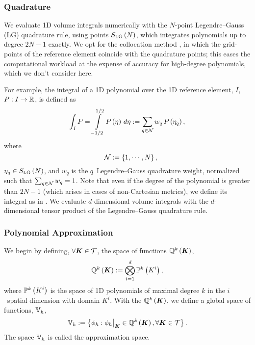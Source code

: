 \subsubsection{Quadrature}

We evaluate 1D volume integrals numerically with the $N$-point
Legendre--Gauss (LG) quadrature rule, using points $S_{\textsc{LG}}\left(N\right)$,
which integrates polynomials up to degree $2N-1$ exactly.
We opt for the collocation method \citep{bfg2013},
in which the grid-points of the
reference element coincide with the quadrature points;
this eases the computational workload at the expense of accuracy for
high-degree polynomials, which we don't consider here.

For example, the integral of a 1D polynomial over the 1D reference element, $I$,
$P:I\to\mathbb{R}$, is defined as
\begin{equation}
  \int_{I}P=\int\limits_{-1/2}^{1/2}P\left(\eta\right)\,d\eta
  :=\sum\limits_{q\in\mathcal{N}}w_{q}\,
  P\left(\eta_{q}\right),
  \label{eq.quad}
\end{equation}
where
\begin{equation}
  \hspace{1em}\mathcal{N}:=\left\{1,\cdots,N\right\},
\end{equation}
$\eta_{q}\in S_{\textsc{LG}}\left(N\right)$, and
$w_{q}$ is the $q$\myth\ Legendre--Gauss quadrature weight,
normalized such that $\sum_{q\in\mathcal{N}}w_{q}=1$.
Note that even if the degree of the polynomial is greater than
$2N-1$ (which arises in cases of non-Cartesian metrics),
we define its integral as in .
We evaluate $d$-dimensional volume integrals with the $d$-dimensional
tensor product of the Legendre--Gauss quadrature rule.

\subsubsection{Polynomial Approximation}

We begin by defining, $\forall\boldsymbol{K}\in\mathcal{T}$, the space of functions
$\mathbb{Q}^{k}\left(\boldsymbol{K}\right)$,
\begin{equation}
  \mathbb{Q}^{k}\left(\boldsymbol{K}\right)
  :=\bigotimes\limits_{i=1}^{d}\mathbb{P}^{k}\left(K^{i}\right),
\end{equation}
where $\mathbb{P}^{k}\left(K^{i}\right)$ is
the space of 1D polynomials of maximal degree $k$ in the $i$\myth\ spatial
dimension with domain $K^{i}$.
With the $\mathbb{Q}^{k}\left(\boldsymbol{K}\right)$, we define a global space of functions,
$\mathbb{V}_{h}$,
\begin{equation}
  \mathbb{V}_{h}:=\left\{\phi_{h}:
  \phi_{h}\big|_{\boldsymbol{K}}\in\mathbb{Q}^{k}\left(\boldsymbol{K}\right),
  \forall\boldsymbol{K}\in\mathcal{T}\right\}.
\end{equation}
The space $\mathbb{V}_{h}$ is called the approximation space.

